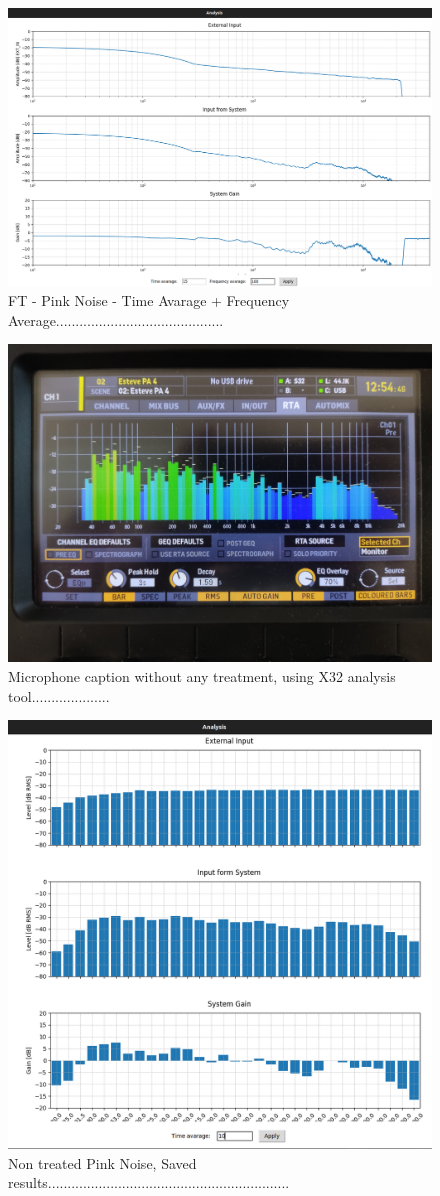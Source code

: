 \begin{figure}[H]
	\centering
	\includegraphics[width=0.6
	\linewidth]{Figures/Coro_FT_WITH_av.png}
	\caption{FT - Pink Noise - Time Avarage + Frequency Average...........................................}
	\label{fig:Coro_FT_av}
\end{figure}

\begin{figure}[H]
	\centering
	\includegraphics[width=0.6
	\linewidth]{Figures/Coro_X32_nontreated.jpeg}
	\caption{Microphone caption without any treatment, using X32 analysis tool....................}
	\label{fig:Coro_X32_nontreated}
\end{figure}

\begin{figure}[H]
	\centering
	\includegraphics[width=0.6
	\linewidth]{Figures/Coro_RTA_Saved.png}
	\caption{Non treated Pink Noise, Saved results..............................................................}
	\label{fig:Coro_RTA_saved}
\end{figure}

